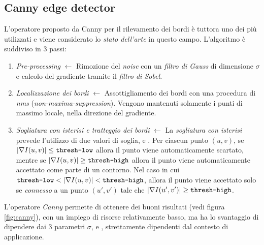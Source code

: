 \subsection{Canny edge detector}
\label{subsec:canny}
L'operatore proposto da Canny \cite{bib:canny} per il rilevamento dei bordi \`e tuttora uno dei pi\`u utilizzati e viene considerato lo \textit{stato dell'arte} in questo campo. L'algoritmo \`e suddiviso in 3 passi:
\begin{enumerate}
	\item \textit{Pre-processing} $\gets$ Rimozione del \textit{noise} con un \textit{filtro di Gauss} di dimensione $\sigma$ e calcolo del gradiente tramite il \textit{filtro di Sobel}.
	\item \textit{Localizzazione dei bordi} $\gets$ Assottigliamento dei bordi con una procedura di \textit{nms} (\textit{non-maxima-suppression}). Vengono mantenuti solamente i punti di massimo locale, nella direzione del gradiente.
	\item \textit{Sogliatura con isterisi e tratteggio dei bordi} $\gets$ La \textit{sogliatura con isterisi} prevede l'utilizzo di due valori di soglia,  e . Per ciascun punto $(u, v)$, se $|\nabla I(u, v)| \leq \texttt{thresh-low}$ allora il punto viene automaticamente scartato, mentre se $|\nabla I(u, v)| \geq \texttt{thresh-high}$ allora il punto viene automaticamente accettato come parte di un contorno. Nel caso in cui $\texttt{thresh-low} < |\nabla I(u, v)| < \texttt{thresh-high}$, allora il punto viene accettato solo se \textit{connesso} a un punto $(u', v')$ tale che $|\nabla I(u', v')| \geq \texttt{thresh-high}$.
\end{enumerate}\par
L'operatore \textit{Canny} permette di ottenere dei buoni risultati (vedi figura \ref{fig:canny}), con un impiego di risorse relativamente basso, ma ha lo svantaggio di dipendere dai 3 parametri $\sigma$,  e , strettamente dipendenti dal contesto di applicazione.

